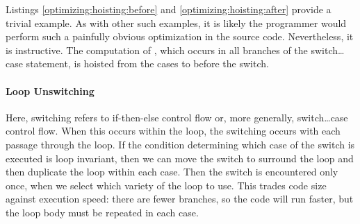 Listings \ref{optimizing:hoisting:before} and \ref{optimizing:hoisting:after} provide a trivial example. As with other such examples, it is likely the programmer would perform such a painfully obvious optimization in the source code. Nevertheless, it is instructive. The computation of , which occurs in all branches of the switch\dots{}case statement, is hoisted from the cases to before the switch.






\paragraph{Loop Unswitching}
Here, switching refers to if-then-else control flow or, more generally, switch\dots{}case control flow. When this occurs within the loop, the switching occurs with each passage through the loop. If the condition determining which case of the switch is executed is loop invariant, then we can move the switch to surround the loop and then duplicate the loop within each case. Then the switch is encountered only once, when we select which variety of the loop to use. This trades code size against execution speed: there are fewer branches, so the code will run faster, but the loop body must be repeated in each case.





